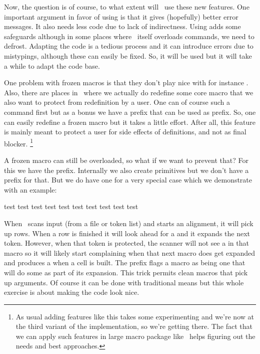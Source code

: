 Now, the question is of course, to what extent will \CONTEXT\ use these new
features. One important argument in favor of using \type {\tolerant} is that it
gives (hopefully) better error messages. It also needs less code due to lack of
indirectness. Using \type {\frozen} adds some safeguards although in some places
where \CONTEXT\ itself overloads commands, we need to defrost. Adapting the code
is a tedious process and it can introduce errors due to mistypings, although
these can easily be fixed. So, it will be used but it will take a while to adapt
the code base.

One problem with frozen macros is that they don't play nice with for instance
\typ {\futurelet}. Also, there are places in \CONTEXT\ where we actually do
redefine some core macro that we also want to protect from redefinition by a
user. One can of course \typ {\unletfrozen} such a command first but as a bonus
we have a prefix \typ {\overloaded} that can be used as prefix. So, one can easily
redefine a frozen macro but it takes a little effort. After all, this feature is
mainly meant to protect a user for side effects of definitions, and not as final
blocker. \footnote {As usual adding features like this takes some experimenting
and we're now at the third variant of the implementation, so we're getting there.
The fact that we can apply such features in large macro package like \CONTEXT\
helps figuring out the needs and best approaches.}

A frozen macro can still be overloaded, so what if we want to prevent that? For
this we have the \typ {\permanent} prefix. Internally we also create primitives
but we don't have a prefix for that. But we do have one for a very special case
which we demonstrate with an example:

\startbuffer[example]
\def\FOO %
  {\noalign{\vskip10pt}}

\noaligned\protected\tolerant{}

\starttabulate[|l|l|]
    \NC test \NC test \NC \NR
    \NC test \NC test \NC \NR
    \FOO
    \NC test \NC test \NC \NR
    \OOF[30pt]
    \NC test \NC test \NC \NR
    \OOF
    \NC test \NC test \NC \NR
\stoptabulate
\stopbuffer

\typebuffer[example][option=TEX]

When \TEX\ scans input (from a file or token list) and starts an alignment, it
will pick up rows. When a row is finished it will look ahead for a \type
{\noalign} and it expands the next token. However, when that token is protected,
the scanner will not see a \type {\noalign} in that macro so it will likely start
complaining when that next macro does get expanded and produces a \type
{\noalign} when a cell is built. The \type {\noaligned} prefix flags a macro as
being one that will do some \type {\noalign} as part of its expansion. This trick
permits clean macros that pick up arguments. Of course it can be done with
traditional means but this whole exercise is about making the code look nice.

